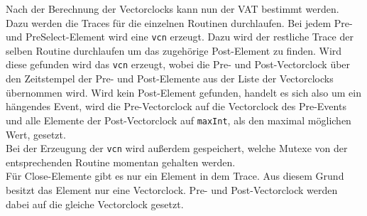 Nach der Berechnung der Vectorclocks kann nun der VAT bestimmt werden. 
Dazu werden die Traces für die einzelnen Routinen durchlaufen. Bei jedem 
Pre- und PreSelect-Element wird eine \texttt{vcn} erzeugt. Dazu wird der restliche Trace 
der selben Routine durchlaufen um das zugehörige Post-Element zu finden. 
Wird diese gefunden wird 
das \texttt{vcn} erzeugt, wobei die Pre- und Post-Vectorclock über den 
Zeitstempel der Pre- und Post-Elemente aus der Liste der Vectorclocks 
übernommen wird.
Wird kein Post-Element gefunden, handelt es sich also um ein hängendes Event, 
wird die Pre-Vectorclock auf die Vectorclock des Pre-Events und alle Elemente 
der Post-Vectorclock auf \texttt{maxInt}, als den maximal möglichen Wert, 
gesetzt.\\
Bei der Erzeugung der \texttt{vcn} wird außerdem gespeichert, welche Mutexe 
von der entsprechenden Routine momentan gehalten werden.     
\\
Für Close-Elemente gibt es nur ein Element in dem Trace. Aus diesem Grund 
besitzt das Element nur eine Vectorclock. Pre- und Post-Vectorclock werden 
dabei auf die gleiche Vectorclock gesetzt.

